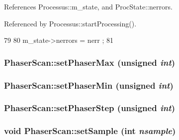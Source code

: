 References Processus::m\_\-state, and ProcState::nerrors.

Referenced by Processus::startProcessing().


\begin{DoxyCode}
79                                              {
80   m_state->nerrors = nerr ;
81 }
\end{DoxyCode}
\hypertarget{classPhaserScan_ad968ae47c77c7813caf69cc22ff40559}{
\subsubsection[{setPhaserMax}]{ PhaserScan::setPhaserMax (unsigned {\em int})}}
\label{classPhaserScan_ad968ae47c77c7813caf69cc22ff40559}
\hypertarget{classPhaserScan_abc98adb04157f08d1c1ba99eee527a37}{
\subsubsection[{setPhaserMin}]{ PhaserScan::setPhaserMin (unsigned {\em int})}}
\label{classPhaserScan_abc98adb04157f08d1c1ba99eee527a37}
\hypertarget{classPhaserScan_a99ff5030b4e551437796c5614f92fffd}{
\subsubsection[{setPhaserStep}]{ PhaserScan::setPhaserStep (unsigned {\em int})}}
\label{classPhaserScan_a99ff5030b4e551437796c5614f92fffd}
\hypertarget{classPhaserScan_ae66b02455c6d5779ba92d3a17abd7ead}{
\subsubsection[{setSample}]{\setlength{\rightskip}{0pt plus 5cm}void PhaserScan::setSample (int {\em nsample})}}
\label{classPhaserScan_ae66b02455c6d5779ba92d3a17abd7ead}


